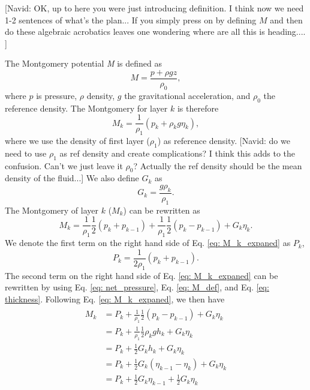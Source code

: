 {\color{red}[Navid: OK, up to here you were just introducing definition. I think now we need 1-2 sentences of what's the plan... If you simply press on by defining $M$ and then do these algebraic acrobatics leaves one wondering where are all this is heading.... ]}
 
The Montgomery potential \textit{M} is defined as
\begin{equation}
    M = \frac{p + \rho gz}{\rho_{0}},
    \label{eq: M_def}
\end{equation}
where $p$ is pressure, $\rho$ density, $g$ the gravitational acceleration, and $\rho_{0}$ the reference density. 
The Montgomery for layer $k$ is therefore 
\begin{equation}
    M_{k} = \frac{1}{\rho_{1}}(p_{k} + \rho_{k}g\eta_{k}),
    \label{eq: M_k}
\end{equation}
{\color{red}where we use the density of first layer ($\rho_{1}$) as reference density. [Navid: do we need to use $\rho_1$ as ref density and create complications? I think this adds to the confusion. Can't we just leave it $\rho_0$? Actually the ref density should be the mean density of the fluid...]}
We also define $G_{k}$ as
\begin{equation}
    G_{k} = \frac{g\rho_{k}}{\rho_{1}}.
    \label{eq: G_k_def}
\end{equation}
The Montgomery of layer $k$ ($M_{k}$) can be rewritten as
\begin{equation}
    M_{k} = \frac{1}{\rho_{1}}\frac{1}{2}(p_{k} + p_{k-1}) + 
            \frac{1}{\rho_{1}}\frac{1}{2}(p_{k} - p_{k-1}) + G_{k}\eta_{k}.
    \label{eq: M_k_expaned}
\end{equation}
We denote the first term on the right hand side of Eq. \eqref{eq: M_k_expaned} as $P_{k}$,
\begin{equation}
    P_{k} = \frac{1}{2\rho_{1}}(p_{k} + p_{k-1}).
    \label{eq: P_k_def}
\end{equation}
The second term on the right hand side of Eq. \eqref{eq: M_k_expaned} can be rewritten by using Eq. \eqref{eq: net_pressure}, Eq. \eqref{eq: M_def}, and Eq. \eqref{eq: thickness}. Following Eq. \eqref{eq: M_k_expaned}, we then have
\begin{align}
\begin{split}
    M_{k} & = P_{k} + \frac{1}{\rho_{1}}\frac{1}{2}(p_{k} - p_{k-1}) + G_{k}\eta_{k} \\
          & = P_{k} + \frac{1}{\rho_{1}}\frac{1}{2}\rho_{k}gh_{k} + G_{k}\eta_{k} \\
          & = P_{k} + \frac{1}{2}G_{k}h_{k} + G_{k}\eta_{k} \\
          & = P_{k} + \frac{1}{2}G_{k}(\eta_{k-1} - \eta_{k}) + G_{k}\eta_{k} \\
          & = P_{k} + \frac{1}{2}G_{k}\eta_{k-1} + \frac{1}{2}G_{k}\eta_{k}
\end{split}
\label{eq: M_k_final}
\end{align}

